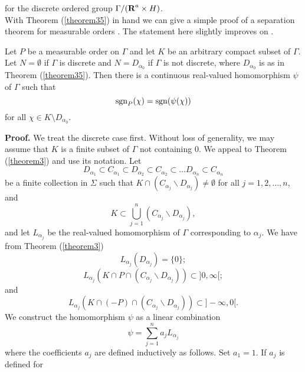 for the discrete ordered group $\Gamma/(\R^a\times H)$.\\
%
With Theorem (\ref{theorem35}) in hand we can 
give a simple proof of a separation 
theorem for measurable orders \cite[Theorem (5.14)]{ah}.  
The statement here slightly improves on \cite{ah}.  
%
\begin{theorem36}
Let $P$ be a measurable order on $\Gamma$ and let 
$K$ be an arbitrary compact subset of $\Gamma$.  
%
Let $N=\emptyset$ if $\Gamma$ is discrete and 
$N=D_{\alpha_0}$ if $\Gamma$ is not discrete, 
where $D_{\alpha_0}$ is as in Theorem (\ref{theorem35}). 
%
Then there is a continuous real-valued 
homomorphism $\psi$ of $\Gamma$ such that\\
%
%
%
$${\rm sgn}_P(\chi)={\rm sgn}(\psi(\chi))$$
%
for all $\chi\in K\setminus D_{\alpha_0}$.
\label{theorem36}
\end{theorem36}
%
{\bf Proof.}  We treat the discrete case first.  
%
Without 
loss of generality, we may assume that $K$
is a finite subset of $\Gamma$ not containing $0$.  
%
We appeal to Theorem (\ref{theorem3}) 
and use its notation.  
%
Let 
%
%
$$D_{\alpha_1}\subset 
C_{\alpha_1}\subset D_{\alpha_2}
\subset C_{\alpha_2}\subset\ldots 
D_{\alpha_n}\subset C_{\alpha_n}$$
%
%
be a finite collection in $\Sigma$ such 
that 
$K\cap (C_{\alpha_j}\backslash D_{\alpha_j})\neq \emptyset$ 
for all $j=1,2,\ldots , n$, 
and 
%
%
$$K\subset \bigcup_{j=1}^n\left(C_{\alpha_j}
\backslash D_{\alpha_j}\right),$$
%
%
and let $L_{\alpha_j}$ be the real-valued 
homomorphism of $\Gamma$ corresponding to 
$\alpha_j$.  
We have from Theorem (\ref{theorem3})
%
%
\begin{equation}
L_{\alpha_j}(D_{\alpha_j})=\{0\};
\label{*}
\end{equation} 
%
%
\begin{equation}
L_{\alpha_j}\left(
			K\cap P \cap (C_{\alpha_j}\backslash D_{\alpha_j})\right)\subset ]0,\infty [;
\label{**}
\end{equation}
and 
\begin{equation}
L_{\alpha_j}\left(
			K\cap (-P) \cap (C_{\alpha_j}\backslash D_{\alpha_j})\right)\subset ]- \infty , 0[.
\label{***}
\end{equation}
%
%
We construct the homomorphism $\psi$ as a linear combination 
%
%
$$\psi=\sum_{j=1}^n a_j L_{\alpha_j}$$
%
%
where the coefficients $a_j$ are 
defined inductively as follows.  
Set $a_1=1$.  If $a_j$ is defined for 
